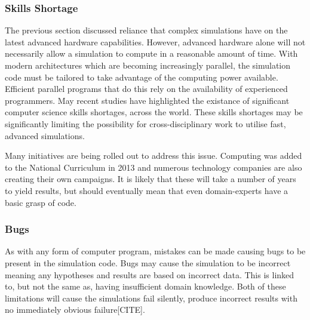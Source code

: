 \documentclass{UoYCSproject}
\begin{document}
\subsubsection{Skills Shortage}
\label{skills_shortage}
The previous section discussed reliance that complex simulations have on the latest advanced hardware capabilities.
However, advanced hardware alone will not necessarily allow a simulation to compute in a reasonable amount of time. 
With modern architectures which are becoming increasingly parallel, the simulation code must be tailored to take advantage of the computing power available.
Efficient parallel programs that do this rely on the availability of experienced programmers.
May recent studies have highlighted the existance of significant computer science skills shortages, across the world\cite{digital_skills_uk, microsoft_blog}.
These skills shortages may be significantly limiting the possibility for cross-disciplinary work to utilise fast, advanced simulations.



Many initiatives are being rolled out to address this issue.
Computing was added to the National Curriculum in 2013\cite{national_curriculum, teacher_training} and numerous technology companies are also creating their own campaigns\cite{apple_education, microsoft_education}.
It is likely that these will take a number of years to yield results, but should eventually mean that even domain-experts have a basic grasp of code.

\subsubsection{Bugs}
As with any form of computer program, mistakes can be made causing bugs to be present in the simulation code.
Bugs may cause the simulation to be incorrect meaning any hypotheses and results are based on incorrect data.
This is linked to, but not the same as, having insufficient domain knowledge.
Both of these limitations will cause the simulations fail silently, produce incorrect results with no immediately obvious failure[CITE].
\end{document}
